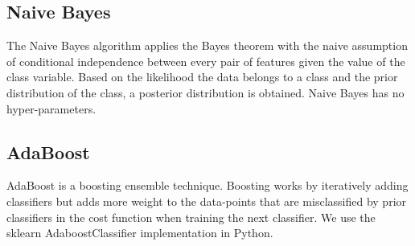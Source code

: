 \documentclass[11pt]{book}
\theoremstyle{definition}
\theoremstyle{definition}
\theoremstyle{definition}
\theoremstyle{remark}
\begin{document}
\hypertarget{naive-bayes}{%
\subsection{Naive Bayes}\label{naive-bayes}}

The Naive Bayes algorithm applies the Bayes theorem with the naive assumption of conditional independence between every pair of features given the value of the class variable. Based on the likelihood the data belongs to a class and the prior distribution of the class, a posterior distribution is obtained. Naive Bayes has no hyper-parameters. 

\hypertarget{adaboost}{%
\subsection{AdaBoost}\label{adaboost}}

AdaBoost is a boosting ensemble technique. Boosting works by iteratively adding classifiers but adds more weight to the data-points that are misclassified by prior classifiers in the cost function when training the next classifier. We use the sklearn AdaboostClassifier implementation in Python.  
\end{document}
